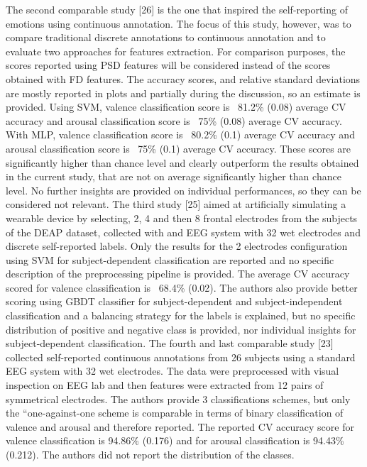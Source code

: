 The second comparable study [26] is the one that inspired the self-reporting of emotions using continuous annotation. The focus of this study, however, was to compare traditional discrete annotations to continuous annotation and to evaluate two approaches for features extraction. For comparison purposes, the scores reported using PSD features will be considered instead of the scores obtained with FD features. The accuracy scores, and relative standard deviations are mostly reported in plots and partially during the discussion, so an estimate is provided. Using SVM, valence classification score is ~81.2\% (0.08) average CV accuracy and arousal classification score is ~75\% (0.08) average CV accuracy. With MLP, valence classification score is ~80.2\% (0.1) average CV accuracy and arousal classification score is ~75\% (0.1) average CV accuracy. These scores are significantly higher than chance level and clearly outperform the results obtained in the current study, that are not on average significantly higher than chance level. No further insights are provided on individual performances, so they can be considered not relevant. 
The third study [25] aimed at artificially simulating a wearable device by selecting, 2, 4 and then 8 frontal electrodes from the subjects of the DEAP dataset, collected with and EEG system with 32 wet electrodes and discrete self-reported labels. Only the results for the 2 electrodes configuration using SVM for subject-dependent classification are reported and no specific description of the preprocessing pipeline is provided. The average CV accuracy scored for valence classification is ~68.4\% (0.02). The authors also provide better scoring using GBDT classifier for subject-dependent and subject-independent classification and a balancing strategy for the labels is explained, but no specific distribution of positive and negative class is provided, nor individual insights for subject-dependent classification. 
The fourth and last comparable study [23] collected self-reported continuous annotations from 26 subjects using a standard EEG system with 32 wet electrodes. The data were preprocessed with visual inspection on EEG lab and then features were extracted from 12 pairs of symmetrical electrodes. The authors provide 3 classifications schemes, but only the “one-against-one scheme is comparable in terms of binary classification of valence and arousal and therefore reported. The reported CV accuracy score for valence classification is 94.86\% (0.176) and for arousal classification is 94.43\% (0.212). The authors did not report the distribution of the classes.
